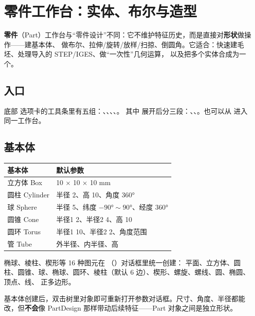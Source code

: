 \chapter{零件工作台：实体、布尔与造型}

\textbf{零件}（Part）工作台与“零件设计”不同：它不维护特征历史，而是直接对\textbf{形状}做操作——建基本体、
做布尔、拉伸/旋转/放样/扫掠、倒圆角。它适合：快速建毛坯、处理导入的 STEP/IGES、做“一次性”几何运算，
以及把多个实体合成为一个。

\section{入口}

底部  选项卡的工具条里有五组：、、、、。
其中  展开后分三段：、、。也可以从
 进入同一工作台。

\section{基本体}

\begin{center}
\small
\begin{tabularx}{\linewidth}{@{}lX@{}}
\toprule
\textbf{基本体} & \textbf{默认参数} \\
\midrule
立方体 Box & 10 × 10 × 10 mm \\
圆柱 Cylinder & 半径 2、高 10、角度 360° \\
球 Sphere & 半径 5、纬度 $-90°\sim90°$、经度 360° \\
圆锥 Cone & 半径1 2、半径2 4、高 10 \\
圆环 Torus & 半径1 10、半径2 2、角度范围 \\
管 Tube & 外半径、内半径、高 \\
\bottomrule
\end{tabularx}
\end{center}

椭球、棱柱、楔形等 16 种图元在 （）对话框里统一创建：
平面、立方体、圆柱、圆锥、球、椭球、圆环、棱柱（默认 6 边）、楔形、螺旋、螺线、圆、椭圆、顶点、线、
正多边形。

\begin{tip}[参数随时可改]
基本体创建后，双击树里对象即可重新打开参数对话框。尺寸、角度、半径都能改，但\textbf{不会}像 PartDesign
那样带动后续特征——Part 对象之间是独立形状。
\end{tip}

